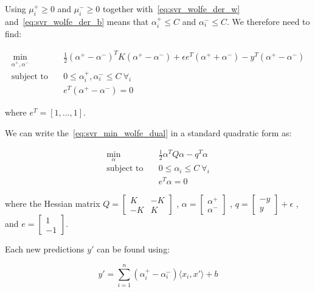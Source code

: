 Using $\mu_i^+ \geq 0$ and $\mu_i^- \geq 0$ together with~\eqref{eq:svr_wolfe_der_w} and~\eqref{eq:svr_wolfe_der_b} means that $\alpha_i^+ \leq C$ and $\alpha_i^- \leq C$. We therefore need to find:

\begin{equation} \label{eq:svr_min_wolfe_dual}
    \begin{aligned}
        \min_{\alpha^+,\alpha^-} \quad & \frac{1}{2}(\alpha^+ - \alpha^-)^TK(\alpha^+ - \alpha^-)+\epsilon e^T(\alpha^+ + \alpha^-)-y^T(\alpha^+ - \alpha^-) \\
            \text{subject to} \quad & 0\leq\alpha_i^+,\alpha_i^- \leq C \ \forall_i \\ & e^T(\alpha^+ - \alpha^-)=0
    \end{aligned}
\end{equation}

where $e^T = [1, \dots, 1]$.

We can write the~\eqref{eq:svr_min_wolfe_dual} in a standard quadratic form as:

\begin{equation}
    \begin{aligned} \label{eq:svr_min_qp_wolfe_dual}
        \min_{\alpha} \quad & \frac{1}{2}\alpha^T Q\alpha-q^T\alpha \\
            \text{subject to} \quad & 0\leq\alpha_i\leq C \ \forall_i \\ & e^T\alpha=0
    \end{aligned}
\end{equation}

where the Hessian matrix $Q =
\begin{bmatrix}
K & -K\\
-K & K 
\end{bmatrix}$
, $\alpha = 
\begin{bmatrix}
\alpha^+\\
\alpha^-
\end{bmatrix}$
, $q =
\begin{bmatrix}
-y\\
y
\end{bmatrix} + \epsilon$
, and $e =
\begin{bmatrix}
1\\
-1
\end{bmatrix}$.

Each new predictions $y'$ can be found using:

\begin{equation} \label{eq:svr_pred}
    y'= \sum_{i=1}^n (\alpha_i^+ - \alpha_i^-)\langle x_i, x' \rangle+b
\end{equation}

